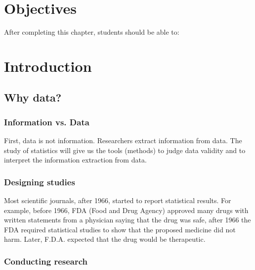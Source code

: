 \documentclass[11pt]{book}\usepackage[]{graphicx}\usepackage[]{color}
\begin{document}
\section{Objectives}

After completing this chapter, students should be able to:


\section{Introduction}

\subsection{Why data?}

\subsubsection{Information vs. Data}

First, data is not information.  Researchers extract information from data.  The study of statistics will give us the tools (methods) to judge data validity and to interpret the information extraction from data.

\subsubsection{Designing studies}

Most scientific journals, after 1966, started to report statistical results.  For example, before 1966, FDA (Food and Drug Agency) approved many drugs with written statements from a physician saying that the drug was safe, after 1966 the FDA required statistical studies to show that the proposed medicine did not harm.  Later, F.D.A. expected that the drug would be therapeutic.

\subsubsection{Conducting research}
\end{document}
